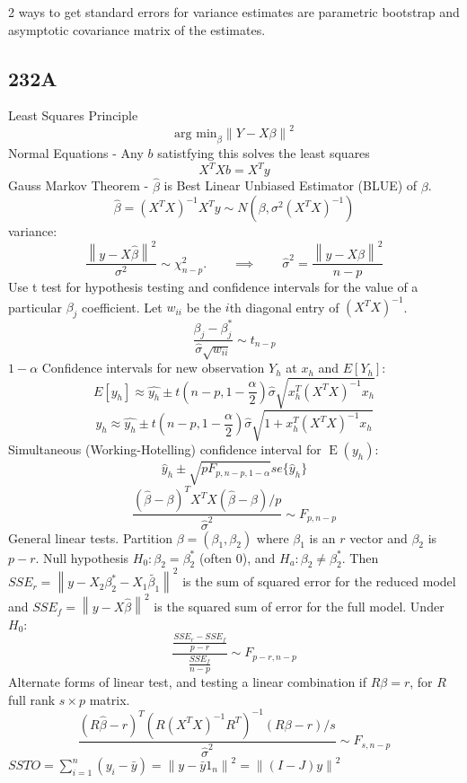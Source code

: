 \documentclass[10pt, twocolumn]{article}
\newcommand{\norm}[1]{\left\lVert#1\right\rVert}
\newcommand{\Expect}{\operatorname{E}}
\begin{document}
2 ways to get standard errors for variance estimates are parametric
bootstrap and asymptotic covariance matrix of the estimates.

\newpage

\subsection*{232A}

Least Squares Principle
\[
    \text{arg min}_\beta \norm{Y - X\beta}^2
\]
Normal Equations - Any $b$ satistfying this solves the least squares
\[
    X^T X b = X^T y
\]
Gauss Markov Theorem - $\hat{\beta}$ is Best Linear Unbiased
Estimator (BLUE) of $\beta$.
\[
    \hat{\beta} = (X^T X)^{-1} X^T y \sim N(\beta, \sigma^2 (X^T X)^{-1})
\]
variance: 
\[
    \frac{\norm{y - X \hat{\beta}}^2}{\sigma^2} \sim
\chi^2_{n-p}.
    \qquad \implies \qquad
    \hat{\sigma}^2 = \frac{\norm{y - X \hat{\beta}}^2}{n - p}
\]
Use t test for hypothesis testing and confidence intervals for the value of
a particular $\beta_j$ coefficient. 
Let $w_{ii}$ be the $i$th diagonal entry of $(X^T X)^{-1}$.
\[
    \frac{\beta_j - \beta_j^*}{\hat{\sigma} \sqrt{w_{ii}}} \sim t_{n-p}
\]
$1 - \alpha$ Confidence intervals for new observation $Y_h$ at $x_h$ and $E[Y_h]$:
\[
    E[y_h] \approx \hat{y_h} \pm t(n-p, 1 - \frac{\alpha}{2}) \hat{\sigma}
        \sqrt{x_h^T (X^T X)^{-1} x_h}
\]
\[
    y_h \approx \hat{y_h} \pm t(n-p, 1 - \frac{\alpha}{2}) \hat{\sigma}
        \sqrt{1 + x_h^T (X^T X)^{-1} x_h}
\]
Simultaneous (Working-Hotelling) confidence interval for $\Expect (y_h)$:
\[
    \hat{y}_h \pm \sqrt{p F_{p, n - p, 1 - \alpha}} se\{ \hat{y}_h \}
\]
\[
    \frac{(\hat{\beta} - \beta)^T X^T X (\hat{\beta} - \beta) /
    p}{\hat{\sigma}^2}
    \sim F_{p, n - p}
\]
General linear tests. Partition $\beta = (\beta_1, \beta_2)$ where $\beta_1$
is an $r$ vector and $\beta_2$ is $p - r$. Null hypothesis $H_0: \beta_2 =
\beta_2^*$ (often 0), and $H_a: \beta_2 \neq \beta_2^*$. Then
$SSE_r = \norm{y - X_2 \beta_2^* - X_1 \tilde{\beta_1}}^2$ is the sum of
squared error for the reduced model and 
$SSE_f = \norm{y - X \hat{\beta}}^2$ is the squared sum of error for the
full model.
Under $H_0$:
\[
    \frac{\frac{SSE_r - SSE_f}{p - r}}
         {\frac{SSE_f}{n - p}}
         \sim F_{p-r, n-p}
\]
Alternate forms of linear test, and testing a linear combination if $R\beta
= r$, for $R$ full rank $s \times p$ matrix.
\[
    \frac{(R \hat{\beta} - r)^T (R(X^T X)^{-1} R^T)^{-1} (R \beta - r) / s}
    {\hat{\sigma}^2} \sim F_{s, n-p}
\]
$SSTO = \sum_{i=1}^n (y_i - \bar{y}) = \norm{y - \bar{y} 1_n }^2
        = \norm{(I - J)y}^2$
\end{document}
